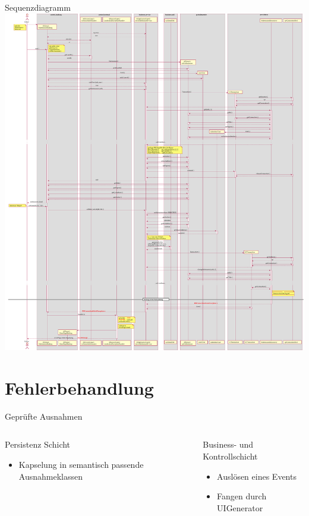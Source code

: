 \documentclass{beamer}
\begin{document}
    \begin{frame}{Sequenzdiagramm}
        \centering
        \includegraphics[height=0.9\textheight]{../../docs/Entwurf/graphics/reject_submission.pdf}
    \end{frame}


    \section{Fehlerbehandlung}

    \begin{frame}{Geprüfte Ausnahmen}
        \pause
        \begin{columns}
            \begin{column}{.48\textwidth}
                Persistenz Schicht
                \begin{itemize}
                    \item Kapselung in semantisch passende Ausnahmeklassen
                \end{itemize}
            \end{column}
            \pause
            \begin{column}{.48\textwidth}
                Business- und Kontrollschicht
                \begin{itemize}
                    \item Auslösen eines Events
                    \item Fangen durch UIGenerator
                \end{itemize}
            \end{column}
        \end{columns}
    \end{frame}
\end{document}
